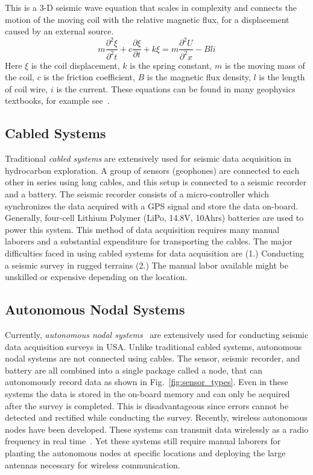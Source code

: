  This is a $3$-D seismic wave equation that scales in complexity and connects the motion of the moving coil with the relative magnetic flux, for a displacement caused by an external source.
\begin{equation}
m\frac{\partial^{2}{\xi}}{\partial^{2}{t}}+c\frac{\partial{\xi}}{\partial{t}}+k\xi = m\frac{\partial^{2}{U}}{\partial^{2}{x}}-Bli
\end{equation} 
Here $\xi$ is the coil displacement, $k$ is the spring constant, $m$ is the moving mass of the coil, $c$ is the friction coefficient, $B$ is the magnetic flux density, $l$ is the length of coil wire, $i$ is the current. These equations can be found in many geophysics textbooks, for example see~\cite{shearer2009introduction}.
\subsection{Cabled Systems}
 Traditional \emph{cabled systems} are extensively used for seismic data acquisition in hydrocarbon exploration. A group of sensors (geophones) are connected to each other in series using long cables, and this setup is connected to a seismic recorder and a battery. The seismic recorder consists of a micro-controller which synchronizes the data acquired with a GPS signal and store the data on-board. Generally, four-cell Lithium Polymer (LiPo, 14.8V, 10Ahrs) batteries are used to power this system. This method of data acquisition requires many manual laborers and a substantial expenditure for transporting the cables. The major difficulties faced in using cabled systems for data acquisition are (1.) Conducting a seismic survey in rugged terrains (2.) The manual labor available might be unskilled or expensive depending on the location.  
 \subsection{Autonomous Nodal Systems}
 Currently, \emph{autonomous nodal systems}~\cite{wood1998distributed} are extensively used for conducting seismic data acquisition surveys in USA. Unlike traditional cabled systems, autonomous nodal systems are not connected using cables. The sensor, seismic recorder, and battery are all combined into a single package called a node, that can autonomously record data as shown in Fig.~\ref{fig:sensor_types}. Even in these systems the data is stored in the on-board memory and can only be acquired after the survey is completed. This is disadvantageous since errors cannot be detected and rectified while conducting the survey. Recently, wireless autonomous nodes have been developed. These systems can transmit data wirelessly as a radio frequency in real time~\cite{jiang2015geophysical}. Yet these systems still require manual laborers for planting the autonomous nodes at specific locations and deploying the large antennas necessary for wireless communication.
